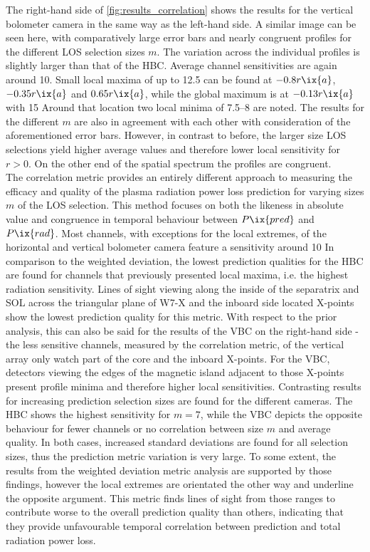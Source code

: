 %
                The right-hand side of \cref{fig:results_correlation} shows the results for the vertical bolometer camera in the same way as the left-hand side. A similar image can be seen here, with comparatively large error bars and nearly congruent profiles for the different LOS selection sizes $m$. The variation across the individual profiles is slightly larger than that of the HBC. Average channel sensitivities are again around \SI{10}{\arbitraryunit}. Small local maxima of up to \SI{12.5}{\arbitraryunit} can be found at $-0.8r\ix{a}$, $-0.35r\ix{a}$ and $0.65r\ix{a}$, while the global maximum is at $-0.13r\ix{a}$ with \SI{15}{\arbitraryunit} Around that location two local minima of \SIrange{7.5}{8}{\arbitraryunit} are noted. The results for the different $m$ are also in agreement with each other with consideration of the aforementioned error bars. However, in contrast to before, the larger size LOS selections yield higher average values and therefore lower local sensitivity for $r>0$. On the other end of the spatial spectrum the profiles are congruent.\\%
                The correlation metric provides an entirely different approach to measuring the efficacy and quality of the plasma radiation power loss prediction for varying sizes $m$ of the LOS selection. This method focuses on both the likeness in absolute value and congruence in temporal behaviour between $P\ix{pred}$ and $P\ix{rad}$. Most channels, with exceptions for the local extremes, of the horizontal and vertical bolometer camera feature a sensitivity around \SI{10}{\arbitraryunit} In comparison to the weighted deviation, the lowest prediction qualities for the HBC are found for channels that previously presented local maxima, i.e. the highest radiation sensitivity. Lines of sight viewing along the inside of the separatrix and SOL across the triangular plane of W7-X and the inboard side located X-points show the lowest prediction quality for this metric. With respect to the prior analysis, this can also be said for the results of the VBC on the right-hand side - the less sensitive channels, measured by the correlation metric, of the vertical array only watch part of the core and the inboard X-points. For the VBC, detectors viewing the edges of the magnetic island adjacent to those X-points present profile minima and therefore higher local sensitivities. Contrasting results for increasing prediction selection sizes are found for the different cameras. The HBC shows the highest sensitivity for $m=7$, while the VBC depicts the opposite behaviour for fewer channels or no correlation between size $m$ and average quality. In both cases, increased standard deviations are found for all selection sizes, thus the prediction metric variation is very large. To some extent, the results from the weighted deviation metric analysis are supported by those findings, however the local extremes are orientated the other way and underline the opposite argument. This metric finds lines of sight from those ranges to contribute worse to the overall prediction quality than others, indicating that they provide unfavourable temporal correlation between prediction and total radiation power loss.%
%
